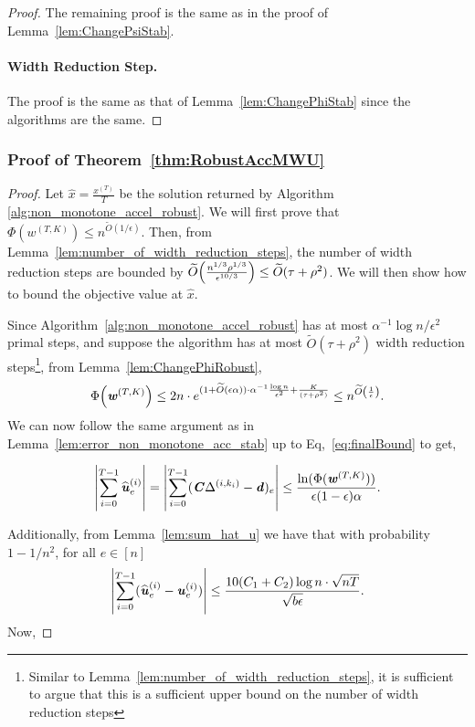 \documentclass[11pt]{article}
\let\originalleft\left
\let\originalright\right
\renewcommand{\left}{\mathopen{}\mathclose\bgroup\originalleft}
\renewcommand{\right}{\aftergroup\egroup\originalright}
\newcommand\dd{\boldsymbol{\mathit{d}}}
\newcommand\uu{\boldsymbol{\mathit{u}}}
\newcommand\ww{\boldsymbol{\mathit{w}}}
\newcommand\xx{\boldsymbol{\mathit{x}}}
\newcommand\CC{\boldsymbol{\mathit{C}}}
\newcommand\xxhat{\widehat{\xx}}
\newcommand\Otil{\widetilde{O}}
\newcommand{\wh}{\widehat}
\newcommand{\wt}{\widetilde}
\begin{document}
\begin{proof}
The remaining proof is the same as in the proof of Lemma~\ref{lem:ChangePsiStab}.


\paragraph*{Width Reduction Step.}
The proof is the same as that of Lemma~\ref{lem:ChangePhiStab} since the algorithms are the same.
\end{proof}


\subsubsection*{Proof of Theorem~\ref{thm:RobustAccMWU}}
\begin{proof}
Let $\xxhat = \frac{\xx^{(T)}}{T}$ be the solution returned by Algorithm \ref{alg:non_monotone_accel_robust}. We will first prove that $\Phi(\ww^{(T,K)}) \leq n^{\wt{O}(1/\epsilon)}$. Then, from Lemma~\ref{lem:number_of_width_reduction_steps}, the number of width reduction steps are bounded by $\wt{O}\left(\frac{n^{1/3} \rho^{1/3} }{\epsilon^{10/3}}\right) \leq \Otil(\tau + \rho^{2})$. We will then show how to bound the objective value at $\wh{\xx}$.

Since Algorithm~\ref{alg:non_monotone_accel_robust} has at most $\alpha^{-1}\log n/\epsilon^2$ primal steps, and suppose the algorithm has at most $\Otil(\tau + \rho^{2})$ width reduction steps\footnote{Similar to Lemma~\ref{lem:number_of_width_reduction_steps}, it is sufficient to argue that this is a sufficient upper bound on the number of width reduction steps}, from Lemma~\ref{lem:ChangePhiRobust}, 
\[
\Phi\left(\ww^{(T,K)}\right) \le  2n\cdot  e^{(1+\wt{O}(\epsilon\alpha)) \cdot \alpha^{-1}\frac{\log n}{\epsilon^2} 
 + \frac{K}{(\tau + \rho^2)}}\leq   n^{\wt{O}\left(\frac{1}{\epsilon} \right)}.
\]
We can now follow the same argument as in Lemma~\ref{lem:error_non_monotone_acc_stab} up to Eq,~\eqref{eq:finalBound} to get,

\begin{align*}
\left|\sum_{i=0}^{T-1} \wh{\uu}^{(i)}_e \right| = \left|\sum_{i=0}^{T-1} (\CC \Delta^{(i,k_i)} - \dd)_e\right| \leq \frac{\ln(\Phi(\ww^{(T,K)}))}{\epsilon(1-\epsilon)\alpha}.
\end{align*}


Additionally, from Lemma~\ref{lem:sum_hat_u} we have that with probability $1 - 1/n^2$, for all $e \in [n]$
\[
\left|\sum_{i=0}^{T-1} (\wh{\uu}^{(i)}_e - \uu^{(i)}_e)\right| \leq \frac{10 (C_1 + C_2) \log n \cdot \sqrt{nT}}{\sqrt{b \epsilon}}.
\]
Now,


\end{proof}
\end{document}
